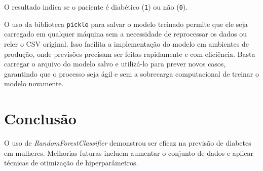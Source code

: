 \documentclass[a4paper,12pt]{article}
\begin{document}
O resultado indica se o paciente é diabético (\texttt{1}) ou não (\texttt{0}).
\vspace{1em}

O uso da biblioteca \texttt{pickle} para salvar o modelo treinado permite que ele seja carregado em qualquer máquina sem a necessidade de reprocessar os dados ou reler o CSV original. Isso facilita a implementação do modelo em ambientes de produção, onde previsões precisam ser feitas rapidamente e com eficiência. Basta carregar o arquivo do modelo salvo e utilizá-lo para prever novos casos, garantindo que o processo seja ágil e sem a sobrecarga computacional de treinar o modelo novamente.


\section{Conclusão}

O uso de \textit{RandomForestClassifier} demonstrou ser eficaz na previsão de diabetes em mulheres. Melhorias futuras incluem aumentar o conjunto de dados e aplicar técnicas de otimização de hiperparâmetros.
\end{document}
